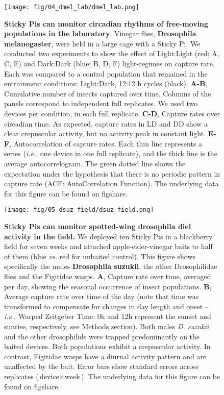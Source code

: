 \documentclass[12pt]{article}
\begin{document}
	\pagebreak
	
	\begin{figure}[ht]
		\centering
		\texttt{[image: fig/04\_dmel\_lab/dmel\_lab.png]}
		\caption{\textbf{Sticky Pis can monitor circadian rhythms of free-moving populations in the laboratory}. Vinegar flies, \textbf{Drosophila melanogaster}, were held in a large cage with a Sticky Pi. We conducted two experiments to show the effect of Light:Light (red; A, C, E) and Dark:Dark (blue; B, D, F) light-regimes on capture rate. Each was compared to a control population that remained in the entrainment conditions: Light:Dark, 12:12 h cycles (black). \textbf{A-B}, Cumulative number of insects captured over time. Columns of the panels correspond to independent full replicates. We used two devices per condition, in each full replicate. \textbf{C-D}, Capture rates over circadian time. As expected, capture rates in LD and DD show a clear crepuscular activity, but no activity peak in constant light. \textbf{E-F}, Autocorrelation of capture rates. Each thin line represents a series (\emph{i.e.}, one device in one full replicate), and the thick line is the average autocorrelogram. The green dotted line shows the expectation under the hypothesis that there is no periodic pattern in capture rate (ACF: AutoCorrelation Function).
        The underlying data for this figure can be found on figshare\cite{noauthor_datasets_2022}.
		}
		\label{fig:04}
	\end{figure}
	
	\pagebreak
	
	\begin{figure}[ht]
		\centering
		\texttt{[image: fig/05\_dsuz\_field/dsuz\_field.png]}
		\caption{\textbf{Sticky Pis can monitor spotted-wing drosophila diel activity in the field.} We deployed ten Sticky Pis in a blackberry field for seven weeks and attached apple-cider-vinegar baits to half of them (blue \emph{vs.} red for unbaited control). This figure shows specifically the males \textbf{Drosophila suzukii}, the other Drosophilidae flies and the Figitidae wasps. \textbf{A}, Capture rate over time, averaged per day, showing the seasonal occurrence of insect populations. \textbf{B}, Average capture rate over time of the day (note that time was transformed to compensate for changes in day length and onset – \emph{i.e.}, Warped Zeitgeber Time: 0h and 12h represent the sunset and sunrise, respectively, see Methods section). Both males \emph{D. suzukii} and the other drosophilids were trapped predominantly on the baited devices. Both populations exhibit a crepuscular activity. In contrast, Figitidae wasps have a diurnal activity pattern and are unaffected by the bait. Error bars show standard errors across replicates ($\text{device} \times{} \text{week}$).
        The underlying data for this figure can be found on figshare\cite{noauthor_datasets_2022}.}
		\label{fig:05}
	\end{figure}
	
\end{document}

